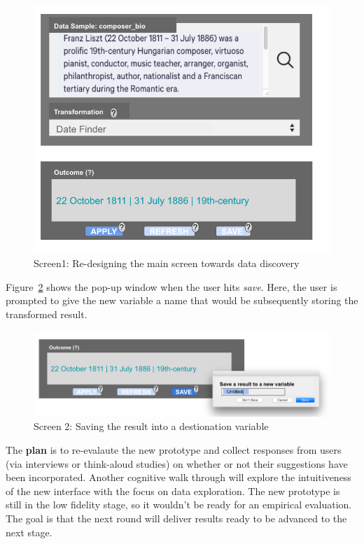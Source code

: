\documentclass[12pt,letterpaper]{article}
\begin{document}
\begin{figure}[h]
\centering
\includegraphics[scale=.4]{figures/m3/interface_redesign_screen1.png}
\caption{Screen1: Re-designing the main screen towards data discovery}
\label{fig::2}
\end{figure}

Figure~\ref{fig::3} shows the pop-up window when the user hits \textit{save}. Here, the user is prompted to give the new variable a name that would be subsequently storing the transformed result.


\begin{figure}[h]
\centering
\includegraphics[scale=.3]{figures/m3/interface_resdesign_screen3.png}
\caption{Screen 2: Saving the result into a destionation variable}
\label{fig::3}
\end{figure}

The \textbf{plan} is to re-evalaute the new prototype and collect responses from users (via interviews or think-aloud studies) on whether or not their suggestions have been incorporated. Another cognitive walk through will explore the intuitiveness of the new interface with the focus on data exploration. The new prototype is still in the low fidelity stage, so it wouldn't be ready for an empirical evaluation. The goal is that the next round will deliver results ready to be advanced to the next stage.
\end{document}
